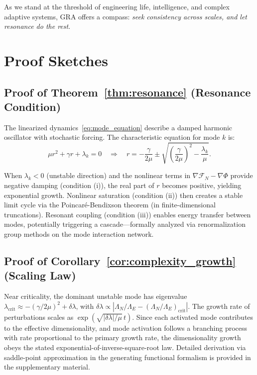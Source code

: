 \documentclass[11pt,a4paper]{article}
\theoremstyle{plain}
\theoremstyle{definition}
\theoremstyle{remark}
\newcommand{\Foam}{\Phi}
\newcommand{\Functional}{\mathcal{F}}
\newcommand{\grad}{\nabla}
\begin{document}
As we stand at the threshold of engineering life, intelligence, and complex adaptive systems, GRA offers a compass: \textit{seek consistency across scales, and let resonance do the rest}.

\appendix

\section{Proof Sketches}
\label{app:proofs}

\subsection{Proof of Theorem~\ref{thm:resonance} (Resonance Condition)}

The linearized dynamics~\eqref{eq:mode_equation} describe a damped harmonic oscillator with stochastic forcing. The characteristic equation for mode $k$ is:
\[
\mu r^2 + \gamma r + \lambda_k = 0 \quad \Rightarrow \quad r = -\frac{\gamma}{2\mu} \pm \sqrt{\left(\frac{\gamma}{2\mu}\right)^2 - \frac{\lambda_k}{\mu}}.
\]

When $\lambda_k < 0$ (unstable direction) and the nonlinear terms in $\grad\Functional_N - \grad\Foam$ provide negative damping (condition (i)), the real part of $r$ becomes positive, yielding exponential growth. Nonlinear saturation (condition (ii)) then creates a stable limit cycle via the Poincaré-Bendixson theorem (in finite-dimensional truncations). Resonant coupling (condition (iii)) enables energy transfer between modes, potentially triggering a cascade---formally analyzed via renormalization group methods on the mode interaction network.

\subsection{Proof of Corollary~\ref{cor:complexity_growth} (Scaling Law)}

Near criticality, the dominant unstable mode has eigenvalue $\lambda_{\text{crit}} \approx -(\gamma/2\mu)^2 + \delta\lambda$, with $\delta\lambda \propto |\Lambda_N/\Lambda_E - (\Lambda_N/\Lambda_E)_{\text{crit}}|$. The growth rate of perturbations scales as $\exp(\sqrt{|\delta\lambda|/\mu} \, t)$. Since each activated mode contributes to the effective dimensionality, and mode activation follows a branching process with rate proportional to the primary growth rate, the dimensionality growth obeys the stated exponential-of-inverse-square-root law. Detailed derivation via saddle-point approximation in the generating functional formalism is provided in the supplementary material.
\end{document}
